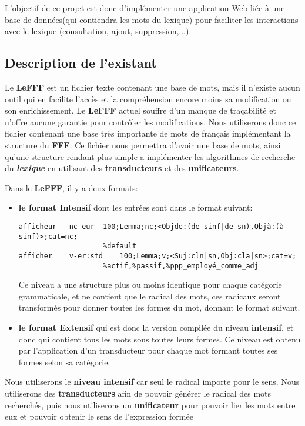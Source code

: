 {L'objectif de ce projet est donc d'implémenter une application Web liée à une base de données(qui contiendra les mots du lexique) pour faciliter les interactions avec le lexique (consultation, ajout, suppression,...).\par}


\subsection{Description de l'existant }
{}
{Le \textbf{LeFFF} est un fichier texte contenant une base de mots, mais il n'existe aucun outil qui en facilite l'accès et la compréhension encore moins sa modification ou son enrichissement. Le \textbf{LeFFF} actuel souffre d'un manque de traçabilité et n'offre aucune garantie pour contrôler les modifications. Nous utiliserons donc ce fichier contenant une base très importante de mots de français implémentant la structure du \textbf{FFF}. Ce fichier nous permettra d'avoir une base de mots, ainsi qu'une structure rendant plus simple a implémenter les algorithmes de recherche du \textit{\bf lexique} en utilisant des \textbf{transducteurs} et des \textbf{unificateurs}.\par}
{Dans le \textbf{LeFFF}, il y a deux formats:\par}
\begin{itemize}
\item \textbf{le format Intensif} dont les entrées sont dans le format suivant:
\small
\begin{verbatim}
afficheur	nc-eur	100;Lemma;nc;<Objde:(de-sinf|de-sn),Objà:(à-sinf)>;cat=nc;
                    %default
afficher	v-er:std	100;Lemma;v;<Suj:cln|sn,Obj:cla|sn>;cat=v;
                    %actif,%passif,%ppp_employé_comme_adj
\end{verbatim}
\normalsize
Ce niveau a une structure plus ou moins identique pour chaque catégorie grammaticale, et ne contient que le radical des mots, ces radicaux seront transformés pour donner toutes les formes du mot, donnant le format suivant.
\item \textbf{le format Extensif} qui est donc la version compilée du niveau \textbf{intensif}, et donc qui contient tous les mots sous toutes leurs formes. Ce niveau est obtenu par l'application d'un transducteur pour chaque mot formant toutes ses formes selon sa catégorie.
\end{itemize}
{Nous utiliserons le \textbf{niveau intensif} car seul le radical importe pour le sens. Nous utiliserons des \textbf{transducteurs} afin de pouvoir générer le radical des mots recherchés, puis nous utiliserons un \textbf{unificateur} pour pouvoir lier les mots entre eux et pouvoir obtenir le sens de l'expression formée}

